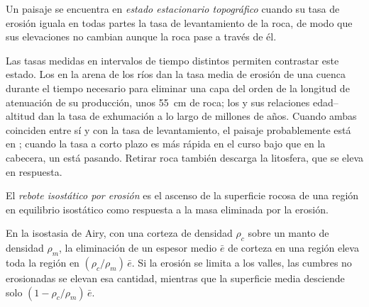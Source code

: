 \begin{definition}\label{def:b3:quantitative-geomorphology:steady-state}
Un paisaje se encuentra en \emph{estado estacionario topográfico}
cuando su tasa de erosión iguala en todas partes la tasa de levantamiento de la roca, de modo que
sus elevaciones no cambian aunque la roca pase a través de él.
\end{definition}

Las tasas medidas en intervalos de tiempo distintos permiten contrastar este estado. Los  en la arena de los ríos dan la tasa media de erosión de una cuenca durante el tiempo
necesario para eliminar una capa del orden de la longitud de atenuación de su
producción, unos \qty{55}{cm} de roca; los  y sus relaciones edad--altitud dan la
tasa de exhumación a lo largo de millones de años. Cuando ambas coinciden entre sí y con la
tasa de levantamiento, el paisaje probablemente está en ; cuando la
tasa a corto plazo es más rápida en el curso bajo que en la cabecera, un 
está pasando. Retirar roca también descarga la
litosfera, que se eleva en respuesta.

\begin{definition}\label{def:b3:quantitative-geomorphology:rebound}
El \emph{rebote isostático por erosión} es el ascenso de la
superficie rocosa de una región en equilibrio isostático como respuesta a la masa
eliminada por la erosión.
\end{definition}

\begin{proposition}\label{prop:b3:quantitative-geomorphology:rebound}
En la isostasia de Airy, con una corteza de densidad $\rho_c$ sobre un manto de densidad
$\rho_m$, la eliminación de un espesor medio $\bar e$ de corteza en una región eleva
toda la región en $(\rho_c/\rho_m)\,\bar e$. Si la erosión se limita
a los valles, las cumbres no erosionadas se elevan esa cantidad, mientras que la
superficie media desciende solo $(1 - \rho_c/\rho_m)\,\bar e$.
\end{proposition}

